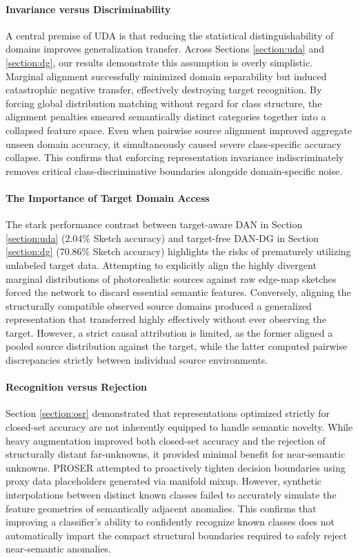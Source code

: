 \documentclass{article}
\begin{document}
\paragraph{Invariance versus Discriminability}
A central premise of UDA is that reducing the statistical distinguishability of domains improves generalization transfer. Across Sections \ref{section:uda} and \ref{section:dg}, our results demonstrate this assumption is overly simplistic. Marginal alignment successfully minimized domain separability but induced catastrophic negative transfer, effectively destroying target recognition. By forcing global distribution matching without regard for class structure, the alignment penalties smeared semantically distinct categories together into a collapsed feature space. Even when pairwise source alignment improved aggregate unseen domain accuracy, it simultaneously caused severe class-specific accuracy collapse. This confirms that enforcing representation invariance indiscriminately removes critical class-discriminative boundaries alongside domain-specific noise.

\paragraph{The Importance of Target Domain Access}
The stark performance contrast between target-aware DAN in Section \ref{section:uda} (2.04\% Sketch accuracy) and target-free DAN-DG in Section \ref{section:dg} (70.86\% Sketch accuracy) highlights the risks of prematurely utilizing unlabeled target data. Attempting to explicitly align the highly divergent marginal distributions of photorealistic sources against raw edge-map sketches forced the network to discard essential semantic features. Conversely, aligning the structurally compatible observed source domains produced a generalized representation that transferred highly effectively without ever observing the target. However, a strict causal attribution is limited, as the former aligned a pooled source distribution against the target, while the latter computed pairwise discrepancies strictly between individual source environments.

\paragraph{Recognition versus Rejection}
Section \ref{section:osr} demonstrated that representations optimized strictly for closed-set accuracy are not inherently equipped to handle semantic novelty. While heavy augmentation improved both closed-set accuracy and the rejection of structurally distant far-unknowns, it provided minimal benefit for near-semantic unknowns. PROSER attempted to proactively tighten decision boundaries using proxy data placeholders generated via manifold mixup. However, synthetic interpolations between distinct known classes failed to accurately simulate the feature geometries of semantically adjacent anomalies. This confirms that improving a classifier's ability to confidently recognize known classes does not automatically impart the compact structural boundaries required to safely reject near-semantic anomalies.
\end{document}
